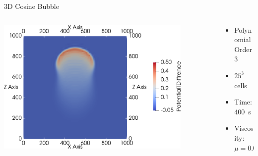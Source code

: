 \documentclass[aspectratio=169]{beamer}
\begin{document}
\begin{frame}{3D Cosine Bubble}
  \begin{columns}
    \begin{column}{0.6\textwidth}
  \begin{center}
     {
    \includegraphics[width=0.85\textwidth]{ppam_cosine_bubble_3d}
    }
  \end{center}
    \end{column}
    \begin{column}{0.4\textwidth}
      \begin{itemize}
      \item Polynomial Order 3
      \item $25^3$ cells
      \item Time: \SI{400}{\s}
      \item Viscosity: $\mu = 0.05$
      \end{itemize}
    \end{column}

  \end{columns}
\end{frame}
\end{document}
